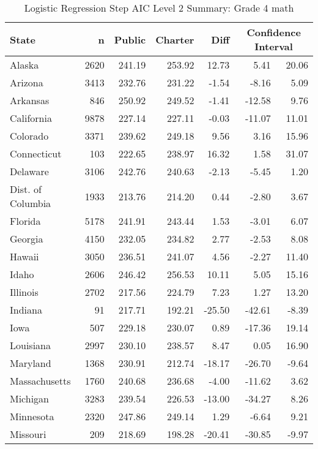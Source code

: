 \begin{table}[ht]
\begin{center}
\caption{Logistic Regression Step AIC Level 2 Summary: Grade 4 math}
\label{g4mathlraiclevel2}
\begin{tabular}{lrrrrrr}
  \hline
  State & n & Public & Charter & Diff & \multicolumn{2}{c}{Confidence Interval} \\ \hline
Alaska & 2620 & 241.19 & 253.92 & 12.73 & 5.41 & 20.06 \\ 
  Arizona & 3413 & 232.76 & 231.22 & -1.54 & -8.16 & 5.09 \\ 
  Arkansas & 846 & 250.92 & 249.52 & -1.41 & -12.58 & 9.76 \\ 
  California & 9878 & 227.14 & 227.11 & -0.03 & -11.07 & 11.01 \\ 
  Colorado & 3371 & 239.62 & 249.18 & 9.56 & 3.16 & 15.96 \\ 
  Connecticut & 103 & 222.65 & 238.97 & 16.32 & 1.58 & 31.07 \\ 
  Delaware & 3106 & 242.76 & 240.63 & -2.13 & -5.45 & 1.20 \\ 
  Dist. of Columbia & 1933 & 213.76 & 214.20 & 0.44 & -2.80 & 3.67 \\ 
  Florida & 5178 & 241.91 & 243.44 & 1.53 & -3.01 & 6.07 \\ 
  Georgia & 4150 & 232.05 & 234.82 & 2.77 & -2.53 & 8.08 \\ 
  Hawaii & 3050 & 236.51 & 241.07 & 4.56 & -2.27 & 11.40 \\ 
  Idaho & 2606 & 246.42 & 256.53 & 10.11 & 5.05 & 15.16 \\ 
  Illinois & 2702 & 217.56 & 224.79 & 7.23 & 1.27 & 13.20 \\ 
  Indiana &  91 & 217.71 & 192.21 & -25.50 & -42.61 & -8.39 \\ 
  Iowa & 507 & 229.18 & 230.07 & 0.89 & -17.36 & 19.14 \\ 
  Louisiana & 2997 & 230.10 & 238.57 & 8.47 & 0.05 & 16.90 \\ 
  Maryland & 1368 & 230.91 & 212.74 & -18.17 & -26.70 & -9.64 \\ 
  Massachusetts & 1760 & 240.68 & 236.68 & -4.00 & -11.62 & 3.62 \\ 
  Michigan & 3283 & 239.54 & 226.53 & -13.00 & -34.27 & 8.26 \\ 
  Minnesota & 2320 & 247.86 & 249.14 & 1.29 & -6.64 & 9.21 \\ 
  Missouri & 209 & 218.69 & 198.28 & -20.41 & -30.85 & -9.97 \\ 

\end{tabular}
\end{center}
\end{table}
